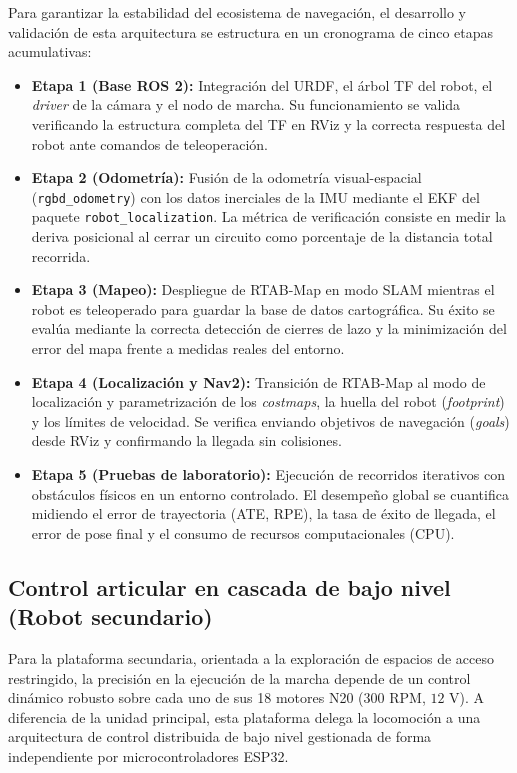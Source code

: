 Para garantizar la estabilidad del ecosistema de navegación, el desarrollo y validación de esta arquitectura se estructura en un cronograma de cinco etapas acumulativas:

\begin{itemize}
    \item \textbf{Etapa 1 (Base ROS 2):} Integración del URDF, el árbol TF del robot, el \textit{driver} de la cámara y el nodo de marcha. Su funcionamiento se valida verificando la estructura completa del TF en RViz y la correcta respuesta del robot ante comandos de teleoperación.
    \item \textbf{Etapa 2 (Odometría):} Fusión de la odometría visual-espacial (\texttt{rgbd\_odometry}) con los datos inerciales de la IMU mediante el EKF del paquete \texttt{robot\_localization}. La métrica de verificación consiste en medir la deriva posicional al cerrar un circuito como porcentaje de la distancia total recorrida.
    \item \textbf{Etapa 3 (Mapeo):} Despliegue de RTAB-Map en modo SLAM mientras el robot es teleoperado para guardar la base de datos cartográfica. Su éxito se evalúa mediante la correcta detección de cierres de lazo y la minimización del error del mapa frente a medidas reales del entorno.
    \item \textbf{Etapa 4 (Localización y Nav2):} Transición de RTAB-Map al modo de localización y parametrización de los \textit{costmaps}, la huella del robot (\textit{footprint}) y los límites de velocidad. Se verifica enviando objetivos de navegación (\textit{goals}) desde RViz y confirmando la llegada sin colisiones.
    \item \textbf{Etapa 5 (Pruebas de laboratorio):} Ejecución de recorridos iterativos con obstáculos físicos en un entorno controlado. El desempeño global se cuantifica midiendo el error de trayectoria (ATE, RPE), la tasa de éxito de llegada, el error de pose final y el consumo de recursos computacionales (CPU).
\end{itemize}



\subsection{Control articular en cascada de bajo nivel (Robot secundario)}

Para la plataforma secundaria, orientada a la exploración de espacios de acceso restringido, la precisión en la ejecución de la marcha depende de un control dinámico robusto sobre cada uno de sus 18 motores N20 ($300\text{ RPM}$, $12\text{ V}$). A diferencia de la unidad principal, esta plataforma delega la locomoción a una arquitectura de control distribuida de bajo nivel gestionada de forma independiente por microcontroladores ESP32.

